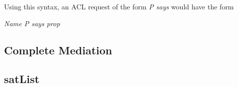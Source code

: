 \documentclass[../../main/main.tex]{subfiles}
\begin{document}
Using this syntax, an ACL request of the form \textit{P says \textphi} would have the form
\centerline{ \textit{Name P says prop \textphi}}


\subsection{Complete Mediation}
\subsection{satList}
\end{document}
